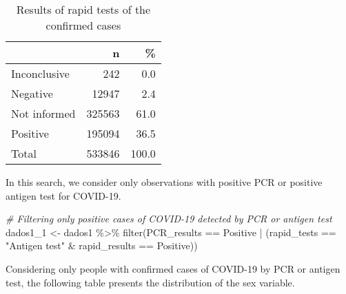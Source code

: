 \documentclass[
]{article}
\newenvironment{Shaded}{\begin{snugshade}}{\end{snugshade}}
\newcommand{\CommentTok}[1]{\textcolor[rgb]{0.56,0.35,0.01}{\textit{#1}}}
\newcommand{\FunctionTok}[1]{\textcolor[rgb]{0.00,0.00,0.00}{#1}}
\newcommand{\NormalTok}[1]{#1}
\newcommand{\OtherTok}[1]{\textcolor[rgb]{0.56,0.35,0.01}{#1}}
\newcommand{\SpecialCharTok}[1]{\textcolor[rgb]{0.00,0.00,0.00}{#1}}
\newcommand{\StringTok}[1]{\textcolor[rgb]{0.31,0.60,0.02}{#1}}
\begin{document}
\begin{table}[H]

\caption{\label{tab:unnamed-chunk-7}Results of rapid tests of the confirmed cases}
\centering
\begin{tabular}[t]{l|r|r}
\hline
  & n & \%\\
\hline
Inconclusive & 242 & 0.0\\
\hline
Negative & 12947 & 2.4\\
\hline
Not informed & 325563 & 61.0\\
\hline
Positive & 195094 & 36.5\\
\hline
Total & 533846 & 100.0\\
\hline
\end{tabular}
\end{table}

In this search, we consider only observations with positive PCR or
positive antigen test for COVID-19.

\begin{Shaded}
\begin{Highlighting}[]
\CommentTok{\# Filtering only positive cases of COVID{-}19 detected by PCR or antigen test}
\NormalTok{dados1\_1 }\OtherTok{\textless{}{-}}\NormalTok{ dados1 }\SpecialCharTok{\%\textgreater{}\%} 
  \FunctionTok{filter}\NormalTok{(PCR\_results }\SpecialCharTok{==} \StringTok{\textquotesingle{}Positive\textquotesingle{}} \SpecialCharTok{|}\NormalTok{ (rapid\_tests }\SpecialCharTok{==} \StringTok{"Antigen test"} \SpecialCharTok{\&}\NormalTok{ rapid\_results }\SpecialCharTok{==} \StringTok{\textquotesingle{}Positive\textquotesingle{}}\NormalTok{))}
\end{Highlighting}
\end{Shaded}

Considering only people with confirmed cases of COVID-19 by PCR or
antigen test, the following table presents the distribution of the sex
variable.
\end{document}
